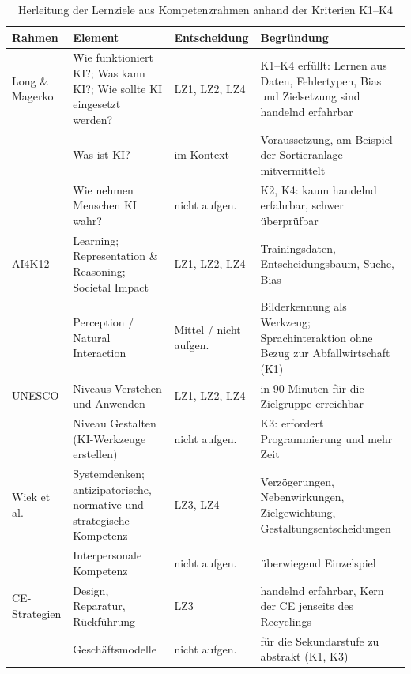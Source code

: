 \documentclass[sigconf,nonacm]{acmart}
\begin{document}
\begin{table}[t]
\caption{Herleitung der Lernziele aus Kompetenzrahmen anhand der Kriterien K1--K4}
\label{tab:lz}
\small
\begin{tabularx}{\textwidth}{@{}L{3.2cm} L{4.6cm} L{2.2cm} Y@{}}
\toprule
\textbf{Rahmen} & \textbf{Element} & \textbf{Entscheidung} & \textbf{Begründung}\\
\midrule
Long \& Magerko \cite{long2020} & Wie funktioniert KI?; Was kann KI?; Wie sollte KI eingesetzt werden? & LZ1, LZ2, LZ4 & K1--K4 erfüllt: Lernen aus Daten, Fehlertypen, Bias und Zielsetzung sind handelnd erfahrbar\\
 & Was ist KI? & im Kontext & Voraussetzung, am Beispiel der Sortieranlage mitvermittelt\\
 & Wie nehmen Menschen KI wahr? & nicht aufgen. & K2, K4: kaum handelnd erfahrbar, schwer überprüfbar\\
AI4K12 \cite{touretzky2019} & Learning; Representation \& Reasoning; Societal Impact & LZ1, LZ2, LZ4 & Trainingsdaten, Entscheidungsbaum, Suche, Bias\\
 & Perception / Natural Interaction & Mittel / nicht aufgen. & Bilderkennung als Werkzeug; Sprachinteraktion ohne Bezug zur Abfallwirtschaft (K1)\\
UNESCO \cite{unesco2024} & Niveaus Verstehen und Anwenden & LZ1, LZ2, LZ4 & in 90 Minuten für die Zielgruppe erreichbar\\
 & Niveau Gestalten (KI-Werkzeuge erstellen) & nicht aufgen. & K3: erfordert Programmierung und mehr Zeit\\
Wiek et al.\ \cite{wiek2011} & Systemdenken; antizipatorische, normative und strategische Kompetenz & LZ3, LZ4 & Verzögerungen, Nebenwirkungen, Zielgewichtung, Gestaltungsentscheidungen\\
 & Interpersonale Kompetenz & nicht aufgen. & überwiegend Einzelspiel\\
CE-Strategien \cite{bocken2016,stahel2013} & Design, Reparatur, Rückführung & LZ3 & handelnd erfahrbar, Kern der CE jenseits des Recyclings\\
 & Geschäftsmodelle & nicht aufgen. & für die Sekundarstufe zu abstrakt (K1, K3)\\
\bottomrule
\end{tabularx}
\end{table}
\end{document}
